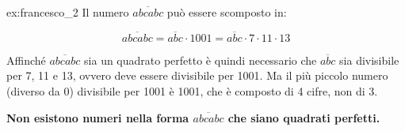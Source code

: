 \begin{soluzione}{ex:francesco_2}
    Il numero $\overline{abcabc}$ può essere scomposto in:

    \begin{equation*}
        \overline{abcabc} = \overline{abc} \cdot 1001 = \overline{abc} \cdot 7 \cdot 11 \cdot 13
    \end{equation*}

    Affinché $\overline{abcabc}$ sia un quadrato perfetto è quindi necessario che $\overline{abc}$ sia divisibile per
    7, 11 e 13, ovvero deve essere divisibile per 1001.
    Ma il più piccolo numero (diverso da 0) divisibile per 1001 è 1001, che è composto di 4 cifre, non di 3.

    \bigskip
    \textbf{Non esistono numeri nella forma $\overline{abcabc}$ che siano quadrati perfetti.}
\end{soluzione}

